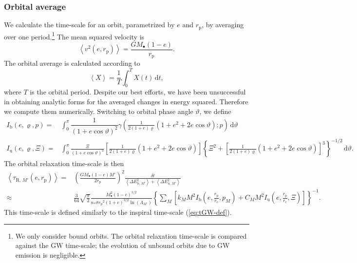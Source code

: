 \documentclass[useAMS,usedcolumn,usegraphicx,usenatbib]{mn2e}
\newcommand{\eqnref}[1]{(\ref{eq:#1})}
\newcommand{\sub}[1]{\ensuremath{_\mathrm{#1}}}
\newcommand{\dd}{\ensuremath{\mathrm{d}}}
\newcommand{\intd}[4]{\ensuremath{\displaystyle \int_{#1}^{#2}{#3}\,\dd{#4}}}
\newcommand{\recip}[1]{\ensuremath{\dfrac{1}{#1}}}
\begin{document}
\begin{onecolumn}
\subsubsection{Orbital average}\label{sec:orbital-ave}

We calculate the time-scale for an orbit, parametrized by $e$ and $r\sub{p}$, by averaging over one period.\footnote{We only consider bound orbits. The orbital relaxation time-scale is compared against the GW time-scale; the evolution of unbound orbits due to GW emission is negligible.} The mean squared velocity is
\begin{equation}
\left\langle v^2\left(e,r\sub{p}\right)\right\rangle = \frac{GM_\bullet(1 - e)}{r\sub{p}}.
\end{equation}
The orbital average is calculated according to \citep[section 2.2b]{Spitzer1987}
\begin{equation}
\left\langle X\right\rangle = \recip{T}\intd{0}{T}{X(t)}{t},
\end{equation}
where $T$ is the orbital period. Despite our best efforts, we have been unsuccessful in obtaining analytic forms for the averaged changes in energy squared. Therefore we compute them numerically. Switching to orbital phase angle $\vartheta$, we define
\begin{align}
I\sub{b}(e,\varrho,p) = {} & \intd{0}{\pi}{\recip{(1 + e \cos\vartheta)^2}\gamma\left(\frac{1}{2(1+e)\varrho}\left(1+e^2+2e\cos\vartheta\right);p\right)}{\vartheta} \\
I\sub{u}(e,\varrho,\Xi) = {} & \intd{0}{\pi}{\frac{\Xi}{(1 + e \cos\vartheta)^2}\left[\frac{1}{2(1+e)\varrho}\left(1+e^2+2e\cos\vartheta\right)\right]\left\{\Xi^2 + \left[\frac{1}{2(1+e)\varrho}\left(1+e^2+2e\cos\vartheta\right)\right]^3\right\}^{-1/2}}{\vartheta}.
\end{align}
The orbital relaxation time-scale is then
\begin{align}
\left\langle\tau_{\mathrm{R},\,M'}\left(e,r\sub{p}\right)\right\rangle = {} & \left(\frac{GM_\bullet(1 - e)M'}{2r\sub{p}}\right)^2\frac{\delta t}{\left\langle\Delta E^2_{\mathrm{b},\,M'}\right\rangle + \left\langle\Delta E^2_{\mathrm{u},\,M'}\right\rangle} \\
 \approx {} & \frac{3}{64}\sqrt{\frac{\pi}{2}} \frac{M_\bullet^2(1 - e)^{1/2}}{n_\ast \sigma r\sub{p}^2(1 + e)^{3/2}\ln\left(\Lambda_{M'}\right)} \left\{\sum_M \left[ k_M M^2 I\sub{b}\left(e,\frac{r\sub{p}}{r\sub{c}},p_M\right) + C_M M^2 I\sub{u}\left(e,\frac{r\sub{p}}{r\sub{c}},\Xi\right)\right]\right\}^{-1}.
\label{eq:orbital-relax}
\end{align}
This time-scale is defined similarly to the inspiral time-scale \eqnref{tGW-def}.


\end{onecolumn}
\end{document}
